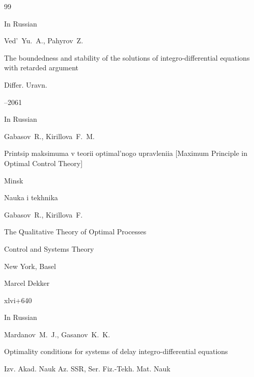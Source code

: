 \begin{thebibliography}{99}






\lang In Russian

\by Ved'~Yu.~A., Pahyrov~Z.

\paper The boundedness and stability of the solutions of integro-differential equations with retarded argument

\jour Differ. Uravn.




--2061




\lang In Russian

\by Gabasov~R., Kirillova~F.~M.

\book Printsip maksimuma v teorii optimal'nogo upravleniia \rm [Maximum Principle in Optimal Control Theory]

\publaddr Minsk

\publ  Nauka i tekhnika








\by Gabasov~R., Kirillova~F.

\book The Qualitative Theory of Optimal Processes


\serial Control and Systems Theory


\publaddr New York, Basel

\publ Marcel Dekker

\totalpages xlvi+640 







\lang In Russian 

\by Mardanov~M.~J., Gasanov~K.~K.

\paper Optimality conditions for systems of delay integro-differential equations

\jour Izv. Akad. Nauk Az. SSR, Ser. Fiz.-Tekh. Mat. Nauk


\end{thebibliography}
